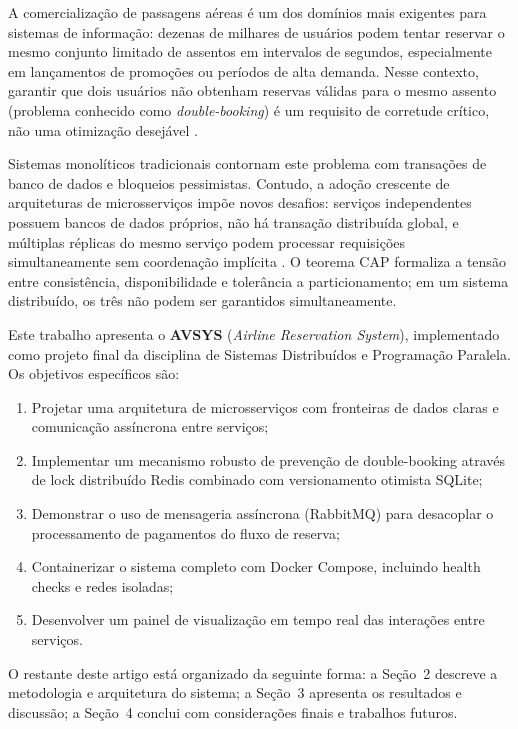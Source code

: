 \documentclass[12pt]{article}
\begin{document}
A comercialização de passagens aéreas é um dos domínios mais exigentes para sistemas
de informação: dezenas de milhares de usuários podem tentar reservar o mesmo conjunto
limitado de assentos em intervalos de segundos, especialmente em lançamentos de
promoções ou períodos de alta demanda. Nesse contexto, garantir que dois usuários não
obtenham reservas válidas para o mesmo assento (problema conhecido como
\textit{double-booking}) é um requisito de corretude crítico, não uma otimização
desejável \cite{gray92}.

Sistemas monolíticos tradicionais contornam este problema com transações de banco de
dados e bloqueios pessimistas. Contudo, a adoção crescente de arquiteturas de
microsserviços impõe novos desafios: serviços independentes possuem bancos de dados
próprios, não há transação distribuída global, e múltiplas réplicas do mesmo serviço
podem processar requisições simultaneamente sem coordenação implícita \cite{newman2015}.
O teorema CAP \cite{brewer2000} formaliza a tensão entre consistência, disponibilidade
e tolerância a particionamento; em um sistema distribuído, os três não podem ser
garantidos simultaneamente.

Este trabalho apresenta o \textbf{AVSYS} (\textit{Airline Reservation System}),
implementado como projeto final da disciplina de Sistemas Distribuídos e Programação
Paralela. Os objetivos específicos são:

\begin{enumerate}
  \item Projetar uma arquitetura de microsserviços com fronteiras de dados claras e
        comunicação assíncrona entre serviços;
  \item Implementar um mecanismo robusto de prevenção de double-booking através de
        lock distribuído Redis combinado com versionamento otimista SQLite;
  \item Demonstrar o uso de mensageria assíncrona (RabbitMQ) para desacoplar o
        processamento de pagamentos do fluxo de reserva;
  \item Containerizar o sistema completo com Docker Compose, incluindo health checks
        e redes isoladas;
  \item Desenvolver um painel de visualização em tempo real das interações entre
        serviços.
\end{enumerate}

O restante deste artigo está organizado da seguinte forma: a Seção~2 descreve a
metodologia e arquitetura do sistema; a Seção~3 apresenta os resultados e discussão;
a Seção~4 conclui com considerações finais e trabalhos futuros.
\end{document}
